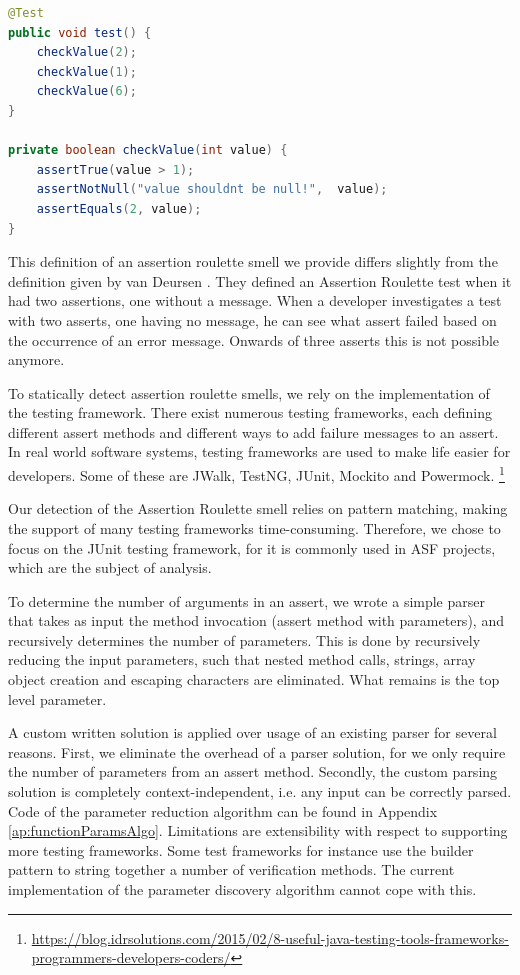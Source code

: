 \documentclass{uvamscse}
\begin{document}
\begin{lstlisting}[language=java, caption=Code with assertion roulette smell, label=Code_Assertion_Roulette]
@Test
public void test() {
	checkValue(2);
	checkValue(1);
	checkValue(6);
}

private boolean checkValue(int value) {
	assertTrue(value > 1);
	assertNotNull("value shouldnt be null!",  value);
	assertEquals(2, value);
}
\end{lstlisting}

This definition of an assertion roulette smell we provide differs slightly from the definition given by van Deursen \cite{van2001refactoring}. They defined an Assertion Roulette test when it had two assertions, one without a message. When a developer investigates a test with two asserts, one having no message, he can see what assert failed based on the occurrence of an error message. Onwards of three asserts this is not possible anymore. 

To statically detect assertion roulette smells, we rely on the implementation of the testing framework. There exist numerous testing frameworks, each defining different assert methods and different ways to add failure messages to an assert. In real world software systems, testing frameworks are used to make life easier for developers. Some of these are JWalk, TestNG, JUnit, Mockito and Powermock. \footnote{\url{https://blog.idrsolutions.com/2015/02/8-useful-java-testing-tools-frameworks-programmers-developers-coders/}}

Our detection of the Assertion Roulette smell relies on pattern matching, making the support of many testing frameworks time-consuming. Therefore, we chose to focus on the JUnit testing framework, for it is commonly used in ASF projects, which are the subject of analysis. 

To determine the number of arguments in an assert, we wrote a simple parser that takes as input the method invocation (assert method with parameters), and recursively determines the number of parameters. This is done by recursively reducing the input parameters, such that nested method calls, strings, array object creation and escaping characters are eliminated. What remains is the top level parameter. 

A custom written solution is applied over usage of an existing parser for several reasons. First, we eliminate the overhead of a parser solution, for we only require the number of parameters from an assert method. Secondly, the custom parsing solution is completely context-independent, i.e. any input can be correctly parsed. Code of the parameter reduction algorithm can be found in Appendix \ref{ap:functionParamsAlgo}. Limitations are extensibility with respect to supporting more testing frameworks. Some test frameworks for instance use the builder pattern  to string together a number of verification methods. The current implementation of the parameter discovery algorithm cannot cope with this.
\end{document}
